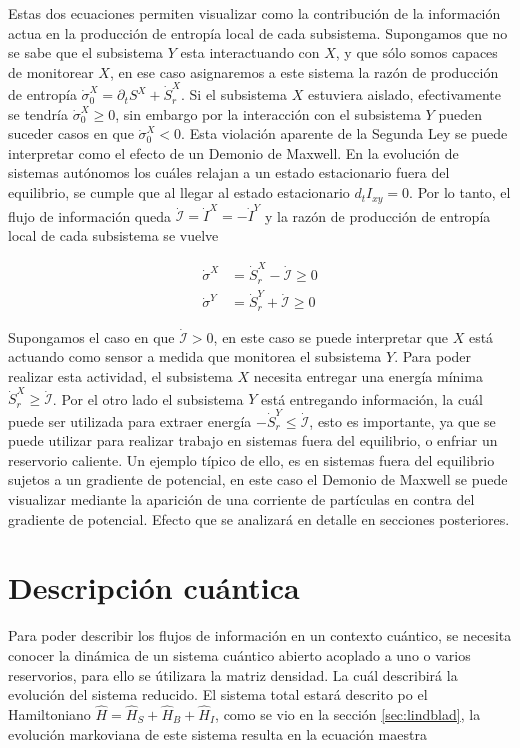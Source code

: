 Estas dos ecuaciones permiten visualizar como la contribución de la información actua en la producción de entropía local de cada subsistema. Supongamos que no se sabe que el subsistema $Y$ esta interactuando con $X$, y que sólo somos capaces de monitorear $X$, en ese caso asignaremos a este sistema la razón de producción de entropía $\dot{\sigma}^{X}_{0} = \partial_{t}S^{X} + \dot{S}_{r}^{X}$. Si el subsistema $X$ estuviera aislado, efectivamente se tendría $\dot{\sigma}^{X}_{0} \geq 0$, sin embargo por la interacción  con el subsistema $Y$ pueden suceder casos en que $\dot{\sigma}^{X}_{0}<0$. Esta violación aparente de la Segunda Ley se puede interpretar como el efecto de un Demonio de Maxwell. En la evolución de sistemas autónomos los cuáles relajan a un estado estacionario fuera del equilibrio, se cumple que al llegar al estado estacionario $d_{t}I_{xy} = 0$. Por lo tanto, el flujo de información queda $\dot{\mathcal{I}} = \dot{I}^{X} = - \dot{I}^{Y}$ y la razón de producción de entropía local de cada subsistema se vuelve

\begin{align*}
    \dot{\sigma}^{X} & = \dot{S}_{r}^{X} - \dot{\mathcal{I}} \geq 0 \\
    \dot{\sigma}^{Y} & =  \dot{S}_{r}^{Y} + \dot{\mathcal{I}} \geq 0  
\end{align*}

Supongamos el caso en que $\dot{\mathcal{I}}> 0$, en este caso se puede interpretar que $X$ está actuando como sensor a medida que monitorea el subsistema $Y$. Para poder realizar esta actividad, el subsistema $X$ necesita entregar una energía mínima $\dot{S}_{r}^{X} \geq \dot{\mathcal {I}}$. Por el otro lado el subsistema $Y$ está entregando información, la cuál puede ser utilizada para extraer energía $-\dot{S}_{r}^{Y} \leq \dot{\mathcal{I}}$, esto es importante, ya que se puede utilizar para realizar trabajo en sistemas fuera del equilibrio, o enfriar un reservorio caliente. Un ejemplo típico de ello, es en sistemas fuera del equilibrio sujetos a un gradiente de potencial, en este caso el Demonio de Maxwell se puede visualizar mediante la aparición de una corriente de partículas en contra del gradiente de potencial. Efecto que se analizará en detalle en secciones posteriores.

\section{Descripción cuántica}
Para poder describir los flujos de información en un contexto cuántico, se necesita conocer la dinámica de un sistema cuántico abierto acoplado a uno o varios reservorios, para ello se útilizara la matriz densidad. La cuál describirá la evolución del sistema reducido. El sistema total estará descrito po el Hamiltoniano $\hat{H} = \hat{H}_{S}+\hat{H}_{B}+ \hat{H}_{I}$, como se vio en la sección \ref{sec:lindblad}, la evolución markoviana de este sistema resulta en la ecuación maestra


